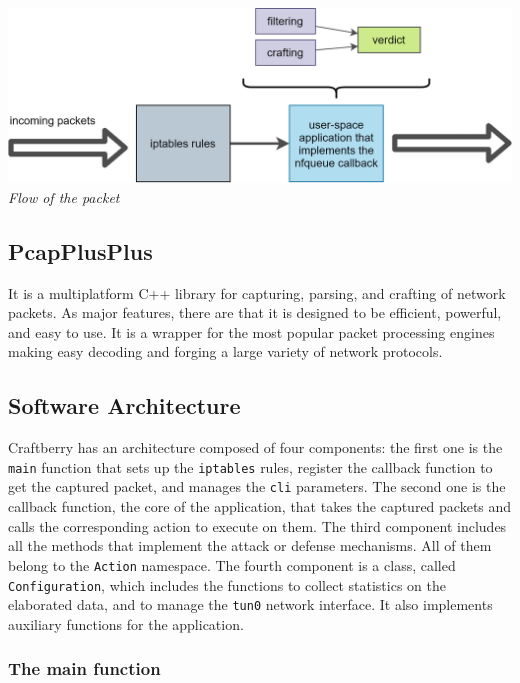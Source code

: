 \documentclass[12pt]{article}
\begin{document}
	\bigbreak
	\begin{center}
		\includegraphics[width=\linewidth]{images/nfqueue_flow.png}\\
		\small{\textit{Flow of the packet}}
	\end{center}
	\bigbreak

	\subsection{PcapPlusPlus}
	It is a multiplatform C++ library for capturing, parsing, and crafting of network packets. As major features, there are that it is designed to be efficient, powerful, and easy to use. It is a wrapper for the most popular packet processing engines making easy decoding and forging a large variety of network protocols.

	\subsection{Software Architecture}
	Craftberry has an architecture composed of four components: the first one is the \lstinline{main} function that sets up the \lstinline{iptables} rules, register the callback function to get the captured packet, and manages the \lstinline{cli} parameters. The second one is the callback function, the core of the application, that takes the captured packets and calls the corresponding action to execute on them. The third component includes all the methods that implement the attack or defense mechanisms. All of them belong to the \lstinline{Action} namespace. The fourth component is a class, called \lstinline{Configuration}, which includes the functions to collect statistics on the elaborated data, and to manage the \lstinline{tun0} network interface. It also implements auxiliary functions for the application.\\

	\subsubsection{The main function}
\end{document}
